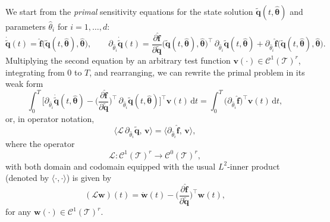 We start from the \emph{primal} sensitivity equations for the state solution $\tilde{\mathbf{q}}(t,\hat{\bm{\theta}})$ and parameters $\hat{\theta}_i$ for $i=1,\dots,d$:\\
$$\dot{\tilde{\mathbf{q}}}(t)
= \hat{\mathbf{f}}\bigl(\tilde{\mathbf{q}}(t,\hat{\bm{\theta}}),\hat{\bm{\theta}}\bigr),
\qquad
\partial_{\hat{\theta}_i}\dot{\tilde{\mathbf{q}}}(t)
= \frac{\partial \hat{\mathbf{f}}}{\partial \tilde{\mathbf{q}}}
  \bigl(\tilde{\mathbf{q}}(t,\hat{\bm{\theta}}),\hat{\bm{\theta}}\bigr)^{\!\top}
  \,\partial_{\hat{\theta}_i}\tilde{\mathbf{q}}(t,\hat{\bm{\theta}})
+ \partial_{\hat{\theta}_i}\hat{\mathbf{f}}
  \bigl(\tilde{\mathbf{q}}(t,\hat{\bm{\theta}}),\hat{\bm{\theta}}\bigr).$$
Multiplying the second equation by an arbitrary test function $\mathbf{v}(\cdot)\in\mathcal{C}^1(\mathcal{T})^r$, integrating from $0$ to $T$, and rearranging, we can rewrite the primal problem in its weak form\\
$$\int_{0}^{T}
\Biggl[
  \partial_{\hat{\theta}_i}\dot{\tilde{\mathbf{q}}}(t,\hat{\bm{\theta}})
  - \biggl(\dfrac{\partial \hat{\mathbf{f}}}{\partial \tilde{\mathbf{q}}}\biggr)^{\top}\,
    \partial_{\hat{\theta}_i}\tilde{\mathbf{q}}(t,\hat{\bm{\theta}})
\Biggr]^{\!\top}
\mathbf{v}(t)\,\mathrm{d}t
=
\int_{0}^{T}
\bigl(\partial_{\hat{\theta}_i}\hat{\mathbf{f}}\bigr)^{\!\top}
\mathbf{v}(t)\,\mathrm{d}t,$$
or, in operator notation,\\
$$\langle \mathcal{L}\,\partial_{\hat{\theta}_i}\tilde{\mathbf{q}},\,\mathbf{v}\rangle
= \langle \partial_{\hat{\theta}_i}\hat{\mathbf{f}},\,\mathbf{v}\rangle,$$
where the operator\\
$$ \mathcal{L}: \mathcal{C}^1(\mathcal{T})^r\to\mathcal{C}^0(\mathcal{T})^r,$$ 
with both domain and codomain equipped with the usual $L^2$-inner product (denoted by $\langle \cdot,\cdot\rangle$) is given by\\
$$(\mathcal{L}\mathbf{w})(t) = \dot{\mathbf{w}}(t) - \biggl(\dfrac{\partial \hat{\mathbf{f}}}{\partial \tilde{\mathbf{q}}}\biggr)^{\top}\mathbf{w}(t),$$
for any $\mathbf{w}(\cdot)\in\mathcal{C}^1(\mathcal{T})^r$. 

